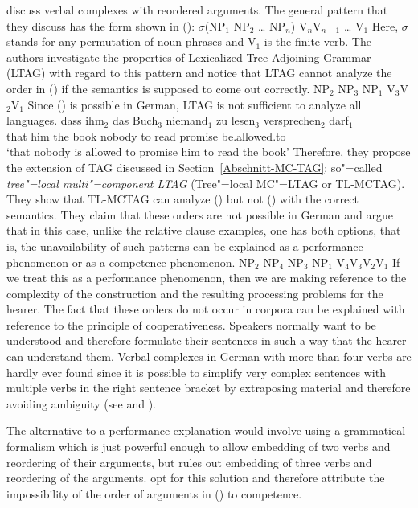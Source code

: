 \citet{JBR2000a} discuss verbal complexes with reordered arguments. The general pattern that they
discuss has the form shown in ():
\ea
$\sigma$(NP$_1$ NP$_2$ \ldots{} NP$_n$) V$_{n}$V$_{n-1}$ \ldots{} V$_{1}$
\z
Here, $\sigma$ stands for any permutation of noun phrases and V$_{1}$ is the finite verb.
The authors investigate the properties of Lexicalized Tree Adjoining Grammar (LTAG) with regard to this
pattern and notice that LTAG cannot analyze the order in () if the semantics is supposed to
come out correctly.
\ea
NP$_2$ NP$_3$ NP$_1$ V$_{3}$V$_{2}$V$_{1}$
\z
Since () is possible in German, LTAG is not sufficient to analyze all languages.
\ea
\gll dass ihm$_2$ das Buch$_3$ niemand$_1$ zu lesen$_3$ versprechen$_2$ darf$_1$\\
     that him     the book     nobody     to read      promise         be.allowed.to\\
\glt `that nobody is allowed to promise him to read the book' 
\z
Therefore, they propose the extension of TAG discussed in Section~\ref{Abschnitt-MC-TAG}; so"=called
\emph{tree"=local multi"=component LTAG} (Tree"=local MC"=LTAG or TL-MCTAG).
They show that TL-MCTAG can analyze () but not () with the correct semantics. They claim that these orders are not possible in German
and argue that in this case, unlike the relative clause examples, one has both options, that is, the
unavailability of such patterns can be explained as a performance phenomenon or as a
competence phenomenon.
\ea
\label{ex-mc-ltag-fails}
NP$_2$ NP$_4$ NP$_3$ NP$_1$ V$_{4}$V$_{3}$V$_{2}$V$_{1}$
\z
If we treat this as a performance phenomenon, then we are making reference to the complexity of the construction and the resulting processing problems
for the hearer. The fact that these orders do not occur in corpora can be explained with reference to the principle of cooperativeness.
Speakers normally want to be understood and therefore formulate their sentences in such a way that the hearer can understand them.
Verbal complexes in German with more than four verbs are hardly ever found since it is possible to simplify very complex sentences with multiple verbs in the 
right sentence bracket by extraposing material and therefore avoiding ambiguity (see \citealp[]{Netter91} and
\citealp[]{MuellerLehrbuch1}).

\largerpage
The alternative to a performance explanation would involve using a grammatical formalism which is
just powerful enough to allow embedding of two verbs and reordering of their arguments, but rules
out embedding of three verbs and reordering of the arguments. \citet{JBR2000a} opt for this solution
and therefore attribute the impossibility of the order of arguments in () to competence. 

